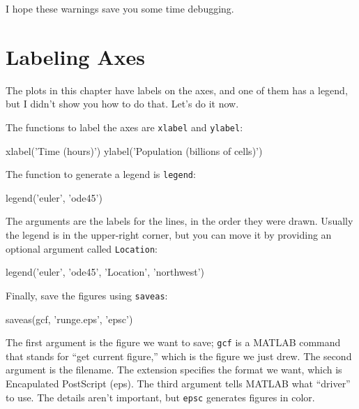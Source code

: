I hope these warnings save you some time debugging.

\section{Labeling Axes}

The plots in this chapter have labels on the axes, and one of them has a legend, but I didn't show you how to do that.  Let's do it now.


The functions to label the axes are \lstinline{xlabel} and \lstinline{ylabel}:

\begin{code}
xlabel('Time (hours)')
ylabel('Population (billions of cells)')
\end{code}

The function to generate a legend is \lstinline{legend}:

\begin{code}
legend('euler', 'ode45')
\end{code}


The arguments are the labels for the lines, in the order they were drawn.  Usually the legend is in the upper-right corner, but you can move it by providing an optional argument called \lstinline{Location}:

\begin{code}
legend('euler', 'ode45', 'Location', 'northwest')
\end{code}

Finally,  save the figures using \lstinline{saveas}:

\begin{code}
saveas(gcf, 'runge.eps', 'epsc')
\end{code}

The first argument is the figure we want to save; \lstinline{gcf} is a MATLAB command that stands for ``get current figure,'' which is the figure we just drew.  The second argument is the filename.  The extension specifies the format we want, which is Encapulated PostScript (eps).  The third argument tells MATLAB what ``driver'' to use.  The details aren't important, but \lstinline{epsc} generates figures in color.


